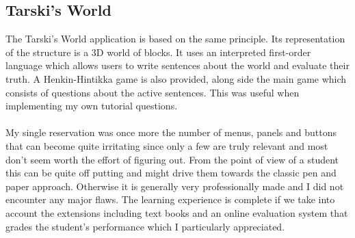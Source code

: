 \documentclass{report}
\begin{document}
\subsection{Tarski's World}
The Tarski's World\cite{tarski} application is based on the same principle. Its 
representation of the structure is a 3D world of blocks. It uses an interpreted 
first-order language which allows users to write sentences about the world and 
evaluate their truth. A Henkin-Hintikka game is also provided, along side the 
main game which consists of questions about the active sentences. This was 
useful when implementing my own tutorial questions. 
\\ \\
My single reservation was once more the number of menus, panels and buttons that
can become quite irritating since only a few are truly relevant and most don't 
seem worth the effort of figuring out. From the point of view of a student this 
can be quite off putting and might drive them towards the classic pen and paper 
approach. Otherwise it is generally very professionally made and I did not 
encounter any major flaws. The learning experience is complete if we take into 
account the extensions including text books and an online evaluation system that 
grades the student's performance which I particularly appreciated.
\end{document}
